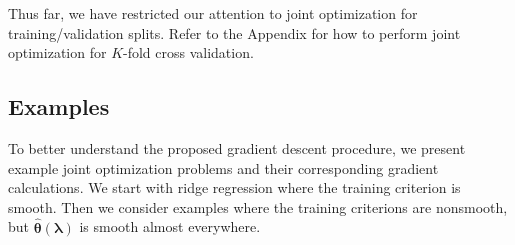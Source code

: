 \documentclass[12pt,letterpaper]{article}
\begin{document}
\begin{algorithm}
\begin{algorithmic}
	\ENDFOR
  \end{algorithmic}
\end{algorithm}

Thus far, we have restricted our attention to joint optimization for training/validation splits. Refer to the Appendix for how to perform joint optimization for $K$-fold cross validation.

\subsection{Examples}\label{exampleSection}

To better understand the proposed gradient descent procedure, we present example joint optimization problems and their corresponding gradient calculations. We start with ridge regression where the training criterion is smooth. Then we consider examples where the training criterions are nonsmooth, but $\hat{\boldsymbol \theta}(\boldsymbol\lambda)$ is smooth almost everywhere.
\end{document}
